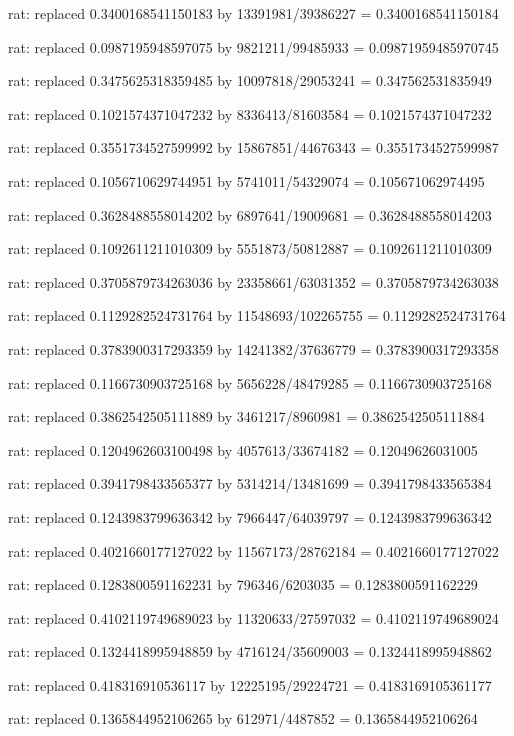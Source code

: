 \documentclass[a4paper,10pt]{article}
\begin{document}
\begin{eulernotebook}
\begin{eulercomment}
\begin{eulercomment}
\begin{eulercomment}
\begin{eulercomment}
\begin{eulercomment}
\begin{eulercomment}
\begin{eulercomment}
\begin{eulercomment}
\begin{eulercomment}
\begin{eulercomment}
\begin{eulercomment}
\begin{eulercomment}
\begin{eulercomment}
\begin{eulercomment}
\begin{eulercomment}
\begin{eulercomment}
\begin{euleroutput}
  rat: replaced 0.3400168541150183 by 13391981/39386227 = 0.3400168541150184
  
  rat: replaced 0.0987195948597075 by 9821211/99485933 = 0.09871959485970745
  
  rat: replaced 0.3475625318359485 by 10097818/29053241 = 0.347562531835949
  
  rat: replaced 0.1021574371047232 by 8336413/81603584 = 0.1021574371047232
  
  rat: replaced 0.3551734527599992 by 15867851/44676343 = 0.3551734527599987
  
  rat: replaced 0.1056710629744951 by 5741011/54329074 = 0.105671062974495
  
  rat: replaced 0.3628488558014202 by 6897641/19009681 = 0.3628488558014203
  
  rat: replaced 0.1092611211010309 by 5551873/50812887 = 0.1092611211010309
  
  rat: replaced 0.3705879734263036 by 23358661/63031352 = 0.3705879734263038
  
  rat: replaced 0.1129282524731764 by 11548693/102265755 = 0.1129282524731764
  
  rat: replaced 0.3783900317293359 by 14241382/37636779 = 0.3783900317293358
  
  rat: replaced 0.1166730903725168 by 5656228/48479285 = 0.1166730903725168
  
  rat: replaced 0.3862542505111889 by 3461217/8960981 = 0.3862542505111884
  
  rat: replaced 0.1204962603100498 by 4057613/33674182 = 0.12049626031005
  
  rat: replaced 0.3941798433565377 by 5314214/13481699 = 0.3941798433565384
  
  rat: replaced 0.1243983799636342 by 7966447/64039797 = 0.1243983799636342
  
  rat: replaced 0.4021660177127022 by 11567173/28762184 = 0.4021660177127022
  
  rat: replaced 0.1283800591162231 by 796346/6203035 = 0.1283800591162229
  
  rat: replaced 0.4102119749689023 by 11320633/27597032 = 0.4102119749689024
  
  rat: replaced 0.1324418995948859 by 4716124/35609003 = 0.1324418995948862
  
  rat: replaced 0.418316910536117 by 12225195/29224721 = 0.4183169105361177
  
  rat: replaced 0.1365844952106265 by 612971/4487852 = 0.1365844952106264
  

\end{euleroutput}
\end{eulercomment}
\end{eulercomment}
\end{eulercomment}
\end{eulercomment}
\end{eulercomment}
\end{eulercomment}
\end{eulercomment}
\end{eulercomment}
\end{eulercomment}
\end{eulercomment}
\end{eulercomment}
\end{eulercomment}
\end{eulercomment}
\end{eulercomment}
\end{eulercomment}
\end{eulercomment}
\end{eulernotebook}
\end{document}
